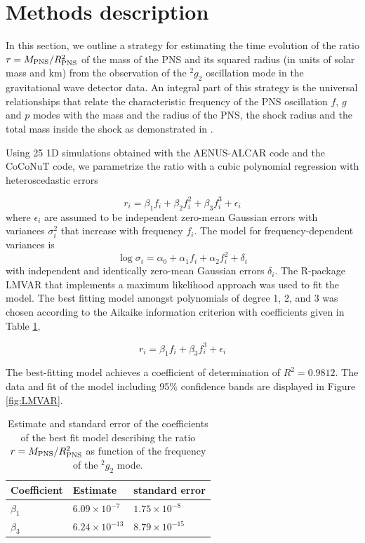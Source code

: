 \section{Methods description}
In this section, we outline a strategy for estimating the time evolution of the
ratio $r=M_{\rm PNS}/R_{\rm PNS}^2$ of the mass of the PNS and its squared radius
(in units of solar mass and km) from the observation of the $\mbox{}^2g_2$
oscillation mode in the gravitational wave detector data.
An integral part of this strategy is the universal relationships that relate the
characteristic frequency of the PNS oscillation $f$, $g$ and $p$ modes with the mass
and the radius of the PNS, the shock radius and the total mass inside the shock as
demonstrated in \cite{Torres:2019}.

Using 25 1D simulations obtained with the {\sc AENUS-ALCAR }code \cite{} and the
{\sc CoCoNuT} \cite{} code, we parametrize the ratio with a cubic polynomial
regression with heteroscedastic errors

\begin{equation}
r_i=\beta_1 f_i + \beta_2 f_i^2 +\beta_3 f_i^3 + \epsilon_i
\end{equation}
where $\epsilon_i$ are assumed to be independent zero-mean Gaussian errors with
variances $\sigma_i^2$ that increase with frequency $f_i$. The model for frequency-dependent
variances is
\begin{equation}
\log \sigma_i=\alpha_0+ \alpha_1 f_i + \alpha_2 f_i^2 + \delta_i
\end{equation}
with independent and identically zero-mean Gaussian errors $\delta_i$. The R-package LMVAR
\cite{lmvar:2019} that implements a maximum likelihood approach was used to fit the model.
The best fitting model amongst polynomials of degree 1, 2, and 3  was chosen according to
the Aikaike information criterion with coefficients given in Table \ref{tab:model},

\begin{equation}\label{eq:universal}
r_i = \beta_1 f_i + \beta_3 f_i^3 + \epsilon_i
\end{equation}

The best-fitting model achieves a coefficient of determination of $R^2=0.9812$.
The data and fit of the model including 95\% confidence bands are displayed in
Figure \ref{fig:LMVAR}.

\begin{table}[h]
  \begin{tabular}{lll}
    \hline
    Coefficient & Estimate & standard error \\
    \hline
    $\beta_1$   & $6.09 \times 10^{-7}$ & $1.75 \times 10^{-8}$ \\
    $\beta_3$   & $6.24 \times 10^{-13}$ & $8.79 \times 10^{-15}$ \\
    \hline
  \end{tabular}
\caption{Estimate and standard error of the coefficients of the best fit model describing the ratio $r=M_{\rm PNS}/R_{\rm PNS}^2$ as function of the frequency of the $\mbox{}^2g_2$ mode.}\label{tab:model}
\end{table}

